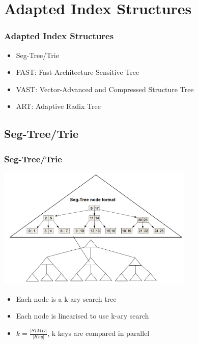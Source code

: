 \documentclass{beamer}
\begin{document}
\section{Adapted Index Structures}

\begin{frame}
\frametitle{Adapted Index Structures}
\begin{itemize}
	\item Seg-Tree/Trie
	\item FAST: Fast Architecture Sensitive Tree
	\item VAST: Vector-Advanced and Compressed Structure Tree
	\item ART: Adaptive Radix Tree
\end{itemize}
\end{frame}

\subsection{Seg-Tree/Trie}
\begin{frame}
\frametitle{Seg-Tree/Trie}
\begin{center}
	\includegraphics[width=0.7\textwidth]{img/seg_tree2.png}
\end{center}
\begin{itemize}
	\item Each node is a k-ary search tree
	\item Each node is linearised to use k-ary search
	\item $k = \frac{\vert SIMD \vert }{\vert Key \vert}$, k keys are compared in parallel
\end{itemize}
\end{frame}
\end{document}
